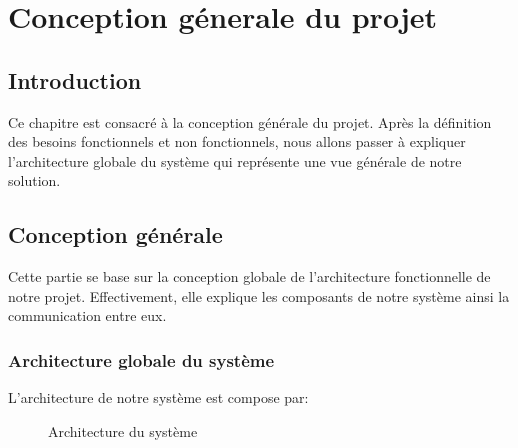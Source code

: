 \chapter{Conception g\'enerale du projet}

\section{Introduction}
Ce chapitre est consacr\'e \`a la conception g\'en\'erale du projet. Apr\`es la d\'efinition des besoins fonctionnels et non fonctionnels, nous allons passer \`a expliquer l'architecture globale du syst\`eme qui repr\'esente une vue g\'en\'erale de notre solution.

\section{Conception g\'en\'erale}


Cette partie se base sur la conception globale de l'architecture fonctionnelle de notre projet. Effectivement, elle explique les composants de notre syst\`eme ainsi la communication entre eux.

\subsection{Architecture globale du syst\`eme}

L'architecture de notre syst\`eme est compose par:

\begin{figure}[h]
	\caption{\label{fig:my-label} Architecture du syst\`eme}
\end{figure}

